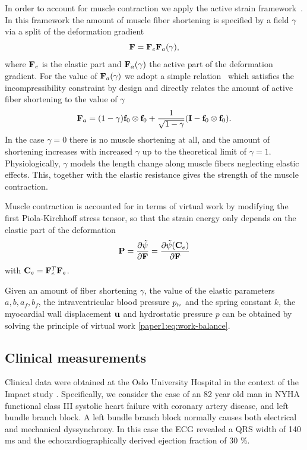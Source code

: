 In order to account for muscle contraction we apply the 
active strain framework~\cite{nardinocchi2007active}.  In this framework the amount
of muscle fiber shortening is specified by a field $\gamma$ via
a split of the deformation gradient
\begin{equation}
  \label{paper1:eq:fsplit}
  \mathbf{F} = \mathbf{F}_e \mathbf{F}_a(\gamma),
\end{equation}
where $\mathbf{F}_e$ is the elastic part and $\mathbf{F}_a(\gamma)$ the active
part of the deformation gradient. For the value of $\mathbf{F}_a(\gamma)$
we adopt a simple relation~\cite{gjerald2015patient, evangelista2011torsion} which satisfies
the incompressibility constraint by design and directly relates the
amount of active fiber shortening to the value of $\gamma$
\begin{equation}
  \mathbf{F}_a = (1 - \gamma) \mathbf{f}_0 \otimes \mathbf{f}_0  + \frac{1}{\sqrt{1 - \gamma}} (\mathbf{I}- \mathbf{f}_0 \otimes \mathbf{f}_0).
 \label{paper1:eq:active_strain}
\end{equation}
In the case $\gamma = 0$ there is no muscle shortening at all, and the
amount of shortening increases with increased $\gamma$ up to the
theoretical limit of $\gamma = 1$. Physiologically, $\gamma$ models the 
length change along muscle fibers neglecting elastic effects. This, together with the elastic
resistance gives the strength of the muscle contraction.

Muscle contraction is accounted for in terms of virtual work by
modifying the first Piola-Kirchhoff stress tensor, so
that the strain energy only depends on the elastic part of the
deformation
\begin{equation}
 \mathbf{P} = \frac{\partial \tilde{\psi}}{\partial \mathbf{F}} = \frac{\partial \tilde{\psi} (\mathbf{C}_e)}{\partial \mathbf{F}}
\label{paper1:eq:active_strain_energy}
\end{equation}
with $\mathbf{C}_e = \mathbf{F}_e^T\mathbf{F}_e$.

Given an amount of fiber shortening $\gamma$, the value of the elastic
 parameters $a, b, a_f, b_f$, the intraventricular blood pressure
 $p_{\textnormal{\tiny{lv}}}$ and the spring constant $k$, the myocardial wall displacement
 $\mathbf{u}$ and hydrostatic pressure $p$ can be obtained by solving the
 principle of virtual work \eqref{paper1:eq:work-balance}. 

 \subsection{Clinical measurements}
\label{paper1:sec:clinical_measurements}
Clinical data were obtained at the Oslo
University Hospital in the context of the Impact study \cite{ImpactStudy2016}. Specifically,
we consider the case of an 82 year old man in NYHA functional 
class III systolic heart failure with coronary
artery disease, and left bundle branch block.
A left bundle branch block normally causes both electrical and mechanical 
dyssynchrony. In this case the ECG revealed a
QRS width of 140 ms and the echocardiographically derived ejection fraction of 30 \%.

